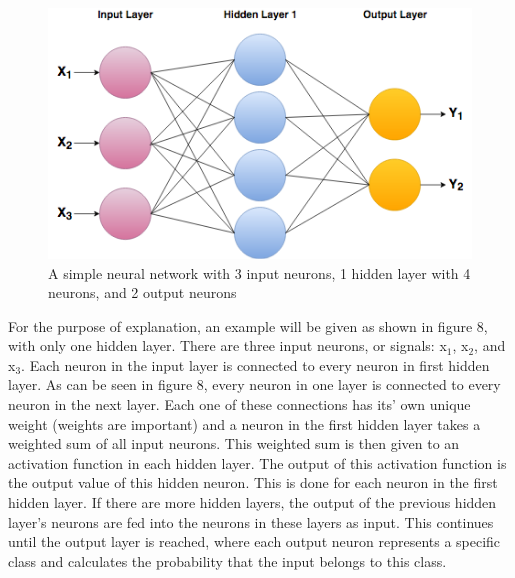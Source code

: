 \documentclass[12pt]{report} %
\begin{document}
\begin{figure}
\centering
\includegraphics[width=5in]{NeuralNetwork}
\caption{A simple neural network with 3 input neurons, 1 hidden layer with 4 neurons, and 2 output neurons}
\end{figure}
	For the purpose of explanation, an example will be given as shown in figure 8, with only one hidden layer. There are three input neurons, or signals: x$_{1}$, x$_{2}$, and x$_{3}$. Each neuron in the input layer is connected to every neuron in first hidden layer. As can be seen in figure 8, every neuron in one layer is connected to every neuron in the next layer. Each one of these connections has its' own unique weight (weights are important) and a neuron in the first hidden layer takes a weighted sum of all input neurons. This weighted sum is then given to an activation function in each hidden layer. The output of this activation function is the output value of this hidden neuron. This is done for each neuron in the first hidden layer. If there are more hidden layers, the output of the previous hidden layer's neurons are fed into the neurons in these layers as input. This continues until the output layer is reached, where each output neuron represents a specific class and calculates the probability that the input belongs to this class.\cite{KubatMachineLearn}
	
\end{document}
